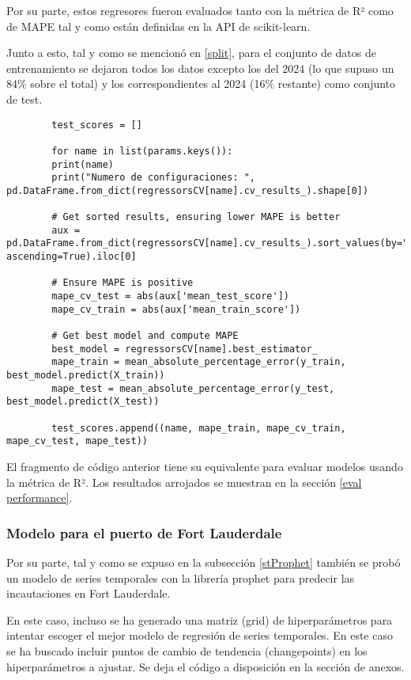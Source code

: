 \documentclass[12pt]{article}
\begin{document}
 	Por su parte, estos regresores fueron evaluados tanto con la métrica de R² como de MAPE tal y como están definidas en la API de scikit-learn.
 	
 	Junto a esto, tal y como se mencionó en \ref{split}, para el conjunto de datos de entrenamiento se dejaron todos los datos excepto los del 2024 (lo que supuso un 84\% sobre el total) y los correspondientes al 2024 (16\% restante) como conjunto de test.
 	
 	\begin{verbatim}
 		test_scores = []
 		
 		for name in list(params.keys()):
 		print(name)
 		print("Numero de configuraciones: ", pd.DataFrame.from_dict(regressorsCV[name].cv_results_).shape[0])
 		
 		# Get sorted results, ensuring lower MAPE is better
 		aux = pd.DataFrame.from_dict(regressorsCV[name].cv_results_).sort_values(by="mean_test_score", ascending=True).iloc[0]
 		
 		# Ensure MAPE is positive
 		mape_cv_test = abs(aux['mean_test_score'])
 		mape_cv_train = abs(aux['mean_train_score'])
 		
 		# Get best model and compute MAPE
 		best_model = regressorsCV[name].best_estimator_
 		mape_train = mean_absolute_percentage_error(y_train, best_model.predict(X_train))
 		mape_test = mean_absolute_percentage_error(y_test, best_model.predict(X_test))
 		
 		test_scores.append((name, mape_train, mape_cv_train, mape_cv_test, mape_test))
 	\end{verbatim}
 	El fragmento de código anterior tiene su equivalente para evaluar modelos usando la métrica de R². Los resultados arrojados se muestran en la sección \ref{eval performance}.
 	
 	
 	\subsubsection{\label{FL model} Modelo para el puerto de Fort Lauderdale}
 	
 	Por su parte, tal y como se expuso en la subsección \ref{stProphet} también se probó un modelo de series temporales con la librería prophet para predecir las incautaciones en Fort Lauderdale.
 	
 	En este caso, incluso se ha generado una matriz (grid) de hiperparámetros para intentar escoger el mejor modelo de regresión de series temporales. En este caso se ha buscado incluir puntos de cambio de tendencia (changepoints) en los hiperparámetros a ajustar.
 	Se deja el código a disposición en la sección de anexos.
 	
\end{document}
